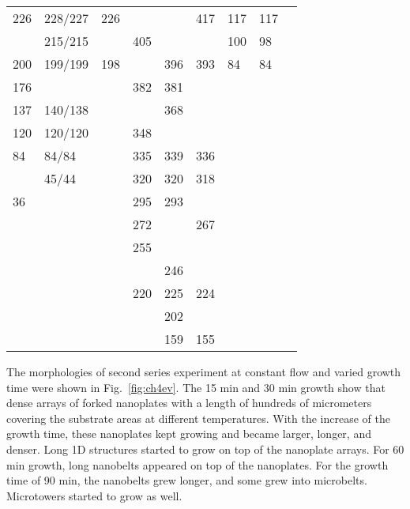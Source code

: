 \begin{landscape}
\begin{table}[htb]
\begin{tabular}{lllllllll}
 226    & 228/227 & 226         &        &        & 417         & 117    & 117       &       \\
        & 215/215 &             & 405    &        &             & 100    & 98        &       \\
 200    & 199/199 & 198         &        & 396    & 393         & 84     & 84        &       \\
 176    &         &             & 382    & 381    &             &        &           &       \\
 137    & 140/138 &             &        & 368    &             &        &           &       \\
 120    & 120/120 &             & 348    &        &             &        &           &       \\
 84     & 84/84   &             & 335    & 339    & 336         &        &           &       \\
        & 45/44   &             & 320    & 320    & 318         &        &           &       \\
 36     &         &             & 295    & 293    &             &        &           &       \\
        &         &             & 272    &        & 267         &        &           &       \\
        &         &             & 255    &        &             &        &           &       \\
        &         &             &        & 246    &             &        &           &       \\
        &         &             & 220    & 225    & 224         &        &           &       \\
        &         &             &        & 202    &             &        &           &       \\
        &         &             &        & 159    & 155         &        &           &       \\
\bottomrule
\end{tabular}
\end{table}
\end{landscape}
The morphologies of second series experiment at constant  flow and varied growth time were shown in Fig.~\ref{fig:ch4ev}. The 15 min and 30 min growth show that dense arrays of  forked nanoplates with a length of hundreds of micrometers covering the substrate areas at different temperatures. With the increase of the growth time, these nanoplates kept growing and became larger, longer, and denser. Long 1D  structures started to grow on top of the nanoplate arrays. For 60 min growth, long nanobelts appeared on top of the nanoplates. For the growth time of 90 min, the nanobelts grew longer, and some grew into microbelts. Microtowers started to grow as well.

